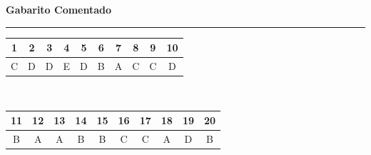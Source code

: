\documentclass[11pt,a4paper]{article}
\newcommand{\parte}[1]{%
  \needspace{7\baselineskip}
  \vspace{1.8em}
  {\Large\bfseries #1}\\[-0.55em]
  {\color{black!30}\rule{\linewidth}{0.5pt}}
  \par\nobreak\smallskip
}
\begin{document}
\newpage

\parte{Gabarito Comentado}

\begin{center}
{\renewcommand{\arraystretch}{1.25}
\begin{tabular}{cccccccccc}
  \toprule
  1 & 2 & 3 & 4 & 5 & 6 & 7 & 8 & 9 & 10 \\
  \midrule
  C & D & D & E & D & B & A & C & C & D \\
  \bottomrule
\end{tabular}\\[0.7em]
\begin{tabular}{cccccccccc}
  \toprule
  11 & 12 & 13 & 14 & 15 & 16 & 17 & 18 & 19 & 20 \\
  \midrule
  B & A & A & B & B & C & C & A & D & B \\
  \bottomrule
\end{tabular}}
\end{center}

\medskip
\end{document}
